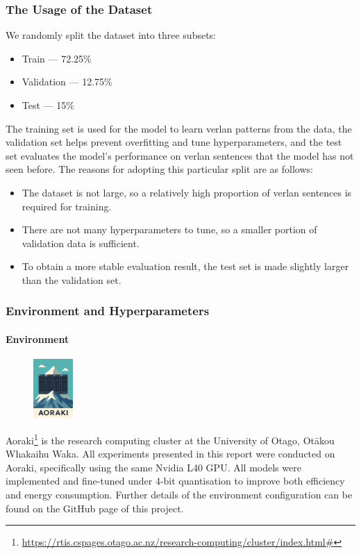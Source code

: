 \documentclass[12pt]{article}
\begin{document}
\subsubsection{The Usage of the Dataset}

We randomly split the dataset into three subsets:

\begin{itemize}
  \item Train --- 72.25\%
  \item Validation --- 12.75\%
  \item Test --- 15\%
\end{itemize}

The training set is used for the model to learn verlan patterns from the data, 
the validation set helps prevent overfitting and tune hyperparameters, 
and the test set evaluates the model's performance on verlan sentences that the model has not seen before.  
The reasons for adopting this particular split are as follows:

\begin{itemize}
  \item The dataset is not large, so a relatively high proportion of verlan sentences is required for training.
  \item There are not many hyperparameters to tune, so a smaller portion of validation data is sufficient.
  \item To obtain a more stable evaluation result, the test set is made slightly larger than the validation set.
\end{itemize}


\subsubsection{Environment and Hyperparameters}

\paragraph{Environment}
\begin{figure}
  \vspace{-60pt}
  \begin{minipage}{1\linewidth}
    \centering
    \includegraphics[width=1.5cm]{figures/aoraki.png}
  \end{minipage}%
\end{figure}
Aoraki\footnote{\url{https://rtis.cspages.otago.ac.nz/research-computing/cluster/index.html\#}} 
is the research computing cluster at the University of Otago, Otākou Whakaihu Waka. 
All experiments presented in this report were conducted on Aoraki, specifically using the same Nvidia L40 GPU. 
All models were implemented and fine-tuned under 4-bit quantisation to improve both efficiency and energy consumption. 
Further details of the environment configuration can be found on the GitHub page of this project.
\end{document}
